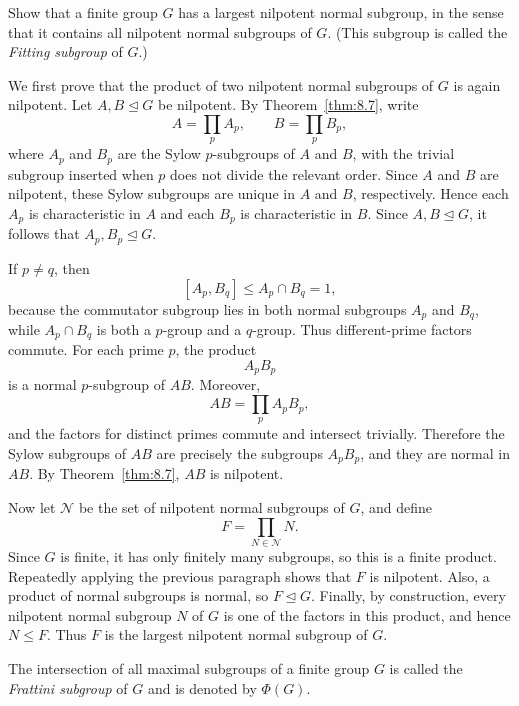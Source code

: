 \documentclass[../Odyssey_Project.tex]{subfiles}
\begin{document}
\begin{exercise}
\label{ex:8.7}
Show that a finite group $G$ has a largest nilpotent normal subgroup, in the sense that it contains all nilpotent normal subgroups of $G$. (This subgroup is called the \emph{Fitting subgroup} of $G$.)
\end{exercise}
\begin{solution}
We first prove that the product of two nilpotent normal subgroups of $G$ is again nilpotent. Let $A,B\trianglelefteq G$ be nilpotent. By Theorem~\ref{thm:8.7}, write
\[
    A=\prod_p A_p,
    \qquad
    B=\prod_p B_p,
\]
where $A_p$ and $B_p$ are the Sylow $p$-subgroups of $A$ and $B$, with the trivial subgroup inserted when $p$ does not divide the relevant order. Since $A$ and $B$ are nilpotent, these Sylow subgroups are unique in $A$ and $B$, respectively. Hence each $A_p$ is characteristic in $A$ and each $B_p$ is characteristic in $B$. Since $A,B\trianglelefteq G$, it follows that $A_p,B_p\trianglelefteq G$.

If $p\neq q$, then
\[
    [A_p,B_q]\leq A_p\cap B_q=1,
\]
because the commutator subgroup lies in both normal subgroups $A_p$ and $B_q$, while $A_p\cap B_q$ is both a $p$-group and a $q$-group. Thus different-prime factors commute. For each prime $p$, the product
\[
    A_pB_p
\]
is a normal $p$-subgroup of $AB$. Moreover,
\[
    AB=\prod_p A_pB_p,
\]
and the factors for distinct primes commute and intersect trivially. Therefore the Sylow subgroups of $AB$ are precisely the subgroups $A_pB_p$, and they are normal in $AB$. By Theorem~\ref{thm:8.7}, $AB$ is nilpotent.

Now let $\mathcal{N}$ be the set of nilpotent normal subgroups of $G$, and define
\[
    F=\prod_{N\in\mathcal{N}}N.
\]
Since $G$ is finite, it has only finitely many subgroups, so this is a finite product. Repeatedly applying the previous paragraph shows that $F$ is nilpotent. Also, a product of normal subgroups is normal, so $F\trianglelefteq G$. Finally, by construction, every nilpotent normal subgroup $N$ of $G$ is one of the factors in this product, and hence $N\leq F$. Thus $F$ is the largest nilpotent normal subgroup of $G$.
\end{solution}

\noindent The intersection of all maximal subgroups of a finite group $G$ is called the \emph{Frattini subgroup} of $G$ and is denoted by $\Phi(G)$.
\end{document}
